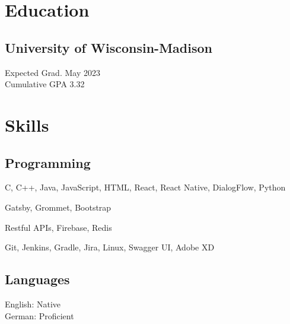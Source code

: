 \documentclass[]{hieudo-build}
\begin{document}
%
%
\begin{minipage}[t]{0.34\textwidth} 

\section{Education} 

\subsection{University of Wisconsin-Madison}
Expected Grad. May 2023 \\
Cumulative GPA 3.32\\
\sectionsep


\section{Skills}

\subsection{Programming}
\smallsectionsep

C, C++, Java, JavaScript, HTML, React, React Native, DialogFlow, Python\\ 
\smallsectionsep

Gatsby, Grommet, Bootstrap \\
\smallsectionsep

Restful APIs, Firebase, Redis \\
\smallsectionsep

Git, Jenkins, Gradle, Jira, Linux, Swagger UI, Adobe XD\\
\sectionsep

\subsection{Languages}
English: Native \\
German: Proficient \\
\sectionsep


\end{minipage}
\end{document}
